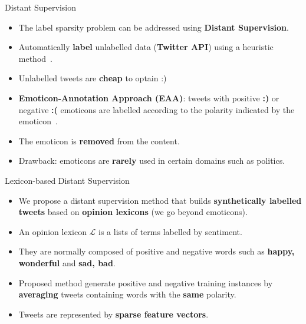 \documentclass[handout]{beamer}
\begin{document}
\begin{frame}{Distant Supervision}
\begin{scriptsize}
  \begin{itemize}
  \item The label sparsity problem can be addressed using \textbf{Distant Supervision}.
   \item Automatically \textbf{label} unlabelled data (\textbf{Twitter API}) using a heuristic method~\cite{Mintz2009}.
     \item Unlabelled tweets are \textbf{cheap} to optain :)
   \item \textbf{Emoticon-Annotation Approach (EAA)}: tweets with positive \textcolor[rgb]{0.00,0.00,1.00}{\textbf{:)}} or negative \textcolor[rgb]{1.00,0.00,0.00}{\textbf{:(}} emoticons are labelled according to the polarity indicated by the emoticon~\cite{Read2005}.
  \item The emoticon is \textbf{removed} from the content.
\item Drawback: emoticons are \textbf{rarely} used in certain domains such as politics. 
    \end{itemize} 

   

\end{scriptsize}

\end{frame}







\begin{frame}{Lexicon-based Distant Supervision}
\begin{scriptsize}
\begin{itemize}
 \item We propose a  distant supervision method that builds \textbf{synthetically labelled tweets} based on \textbf{opinion lexicons} (we go beyond emoticons).
 
 \item  An opinion lexicon $\mathcal{L}$ is a lists of terms labelled by sentiment.
\item They are normally composed of positive and negative words such as \textcolor[rgb]{0.00,0.00,1.00}{\textbf{happy, wonderful}} and \textcolor[rgb]{1.00,0.00,0.00}{\textbf{sad, bad}}.


 \item Proposed method generate positive and negative training instances by \textbf{averaging} tweets containing words with the \textbf{same} polarity.
 
 \item Tweets are represented by \textbf{sparse feature vectors}.

 
\end{itemize}
\end{scriptsize}

\end{frame}
\end{document}
